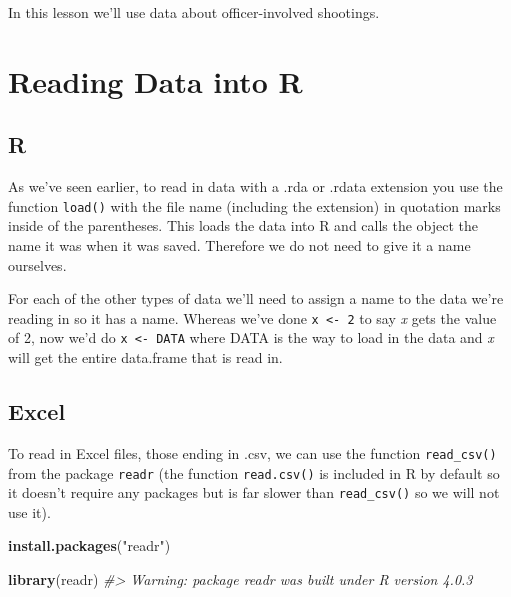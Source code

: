 \documentclass[
  12pt,
]{book}
\newenvironment{Shaded}{\begin{snugshade}}{\end{snugshade}}
\newcommand{\CommentTok}[1]{\textcolor[rgb]{0.37,0.37,0.37}{\textit{#1}}}
\newcommand{\KeywordTok}[1]{\textcolor[rgb]{0.27,0.27,0.27}{\textbf{#1}}}
\newcommand{\NormalTok}[1]{#1}
\newcommand{\StringTok}[1]{\textcolor[rgb]{0.5,0.5,0.5}{#1}}
\begin{document}
In this lesson we'll use data about officer-involved shootings.

\hypertarget{reading-data-into-r-1}{%
\section{Reading Data into R}\label{reading-data-into-r-1}}

\hypertarget{r}{%
\subsection{R}\label{r}}

As we've seen earlier, to read in data with a .rda or .rdata extension you use the function \texttt{load()} with the file name (including the extension) in quotation marks inside of the parentheses. This loads the data into R and calls the object the name it was when it was saved. Therefore we do not need to give it a name ourselves.

For each of the other types of data we'll need to assign a name to the data we're reading in so it has a name. Whereas we've done \texttt{x\ \textless{}-\ 2} to say \emph{x} gets the value of 2, now we'd do \texttt{x\ \textless{}-\ DATA} where DATA is the way to load in the data and \emph{x} will get the entire data.frame that is read in.

\hypertarget{excel}{%
\subsection{Excel}\label{excel}}

To read in Excel files, those ending in .csv, we can use the function \texttt{read\_csv()} from the package \texttt{readr} (the function \texttt{read.csv()} is included in R by default so it doesn't require any packages but is far slower than \texttt{read\_csv()} so we will not use it).

\begin{Shaded}
\begin{Highlighting}[]
\KeywordTok{install.packages}\NormalTok{(}\StringTok{"readr"}\NormalTok{)}
\end{Highlighting}
\end{Shaded}

\begin{Shaded}
\begin{Highlighting}[]
\KeywordTok{library}\NormalTok{(readr)}
\CommentTok{\#\textgreater{} Warning: package \textquotesingle{}readr\textquotesingle{} was built under R version 4.0.3}
\end{Highlighting}
\end{Shaded}
\end{document}

